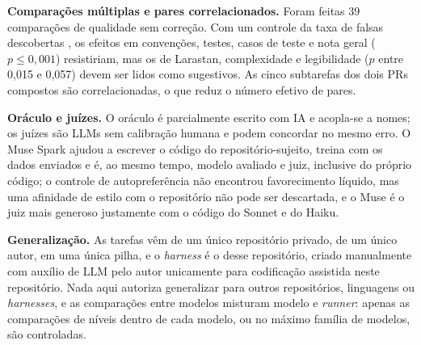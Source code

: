 \textbf{Comparações múltiplas e pares correlacionados.} Foram feitas 39
comparações de qualidade sem correção. Com um controle da taxa de falsas
descobertas \cite{benjamini1995fdr}, os efeitos em convenções, testes, casos de
teste e nota geral ($p \le 0{,}001$) resistiriam, mas os de Larastan,
complexidade e legibilidade ($p$ entre 0,015 e 0,057) devem ser lidos como
sugestivos. As cinco subtarefas dos dois PRs compostos são correlacionadas, o
que reduz o número efetivo de pares.

\textbf{Oráculo e juízes.} O oráculo é parcialmente escrito com IA e acopla-se
a nomes; os juízes são LLMs sem calibração humana e podem concordar no mesmo
erro. O Muse Spark ajudou a escrever o código do repositório-sujeito, treina com
os dados enviados e é, ao mesmo tempo, modelo avaliado e juiz, inclusive do
próprio código; o controle de autopreferência não encontrou favorecimento
líquido, mas uma afinidade de estilo com o repositório não pode ser descartada,
e o Muse é o juiz mais generoso justamente com o código do Sonnet e do Haiku.

\textbf{Generalização.} As tarefas vêm de um único repositório privado, de um
único autor, em uma única pilha, e o \textit{harness} é o desse repositório, criado manualmente com auxílio de LLM pelo autor unicamente para codificação assistida neste repositório.
Nada aqui autoriza generalizar para outros repositórios, linguagens ou
\textit{harnesses}, e as comparações entre modelos misturam modelo e
\textit{runner}: apenas as comparações de níveis dentro de cada modelo, ou no máximo família de modelos, são
controladas.

